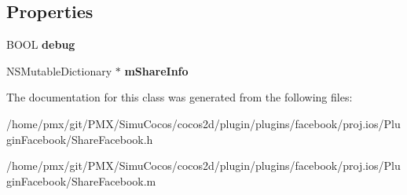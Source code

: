 \subsection*{Properties}
\begin{DoxyCompactItemize}
\item 
\mbox{\label{interfaceShareFacebook_a09fe0dce6ba58d3366ce6ae73a98d0ac}} 
B\+O\+OL {\bfseries debug}
\item 
\mbox{\label{interfaceShareFacebook_a2df748271613253380225f817deb2bed}} 
N\+S\+Mutable\+Dictionary $\ast$ {\bfseries m\+Share\+Info}
\end{DoxyCompactItemize}


The documentation for this class was generated from the following files\+:\begin{DoxyCompactItemize}
\item 
/home/pmx/git/\+P\+M\+X/\+Simu\+Cocos/cocos2d/plugin/plugins/facebook/proj.\+ios/\+Plugin\+Facebook/Share\+Facebook.\+h\item 
/home/pmx/git/\+P\+M\+X/\+Simu\+Cocos/cocos2d/plugin/plugins/facebook/proj.\+ios/\+Plugin\+Facebook/Share\+Facebook.\+m\end{DoxyCompactItemize}

